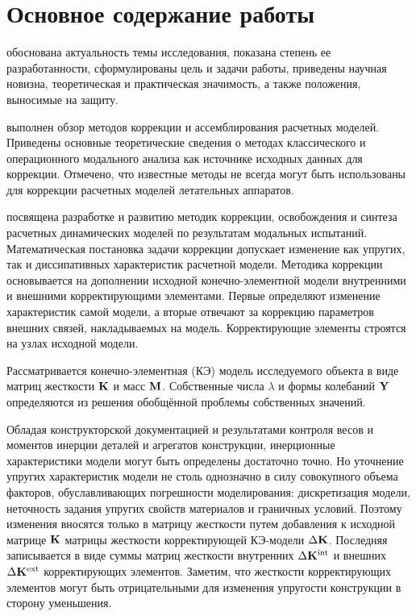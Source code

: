 
\section*{Основное содержание работы}


 обоснована актуальность темы исследования, показана степень ее разработанности, сформулированы цель и задачи работы, приведены научная новизна, теоретическая и практическая значимость, а также положения, выносимые на защиту.


 выполнен обзор методов коррекции и ассемблирования расчетных моделей. Приведены основные теоретические сведения о методах классического и операционного модального анализа как источнике исходных данных для коррекции. Отмечено, что известные методы не всегда могут быть использованы для коррекции расчетных моделей летательных аппаратов.


 посвящена разработке и развитию методик коррекции, освобождения и синтеза расчетных динамических моделей по результатам модальных испытаний. Математическая постановка задачи коррекции допускает изменение как упругих, так и диссипативных характеристик расчетной модели. Методика коррекции основывается на дополнении исходной конечно-элементной модели внутренними и внешними корректирующими элементами. Первые определяют изменение характеристик самой модели, а вторые отвечают за коррекцию параметров внешних связей, накладываемых на модель. Корректирующие элементы строятся на узлах исходной модели. 

Рассматривается конечно-элементная (КЭ) модель исследуемого объекта в виде матриц жесткости $ \mathbf{K} $ и масс $ \mathbf{M} $. Собственные числа $ \lambda $ и формы колебаний $ \mathbf{Y} $ определяются из решения обобщённой проблемы собственных значений.

Обладая конструкторской документацией и результатами контроля весов и моментов инерции деталей и агрегатов конструкции, инерционные характеристики модели могут быть определены достаточно точно. Но уточнение упругих характеристик модели не столь однозначно в силу совокупного объема факторов, обуславливающих погрешности моделирования: дискретизация модели, неточность задания упругих свойств материалов и граничных условий. Поэтому изменения вносятся только в матрицу жесткости путем добавления к исходной матрице $ \mathbf{K} $ матрицы жесткости корректирующей КЭ-модели $ \Delta \mathbf{K} $. Последняя записывается в виде суммы матриц жесткости внутренних $ \Delta \mathbf{K} ^ {\text{int}} $ и внешних $ \Delta \mathbf{K} ^ {\text{ext}} $ корректирующих элементов. Заметим, что жесткости корректирующих элементов могут быть отрицательными для изменения упругости конструкции в сторону уменьшения.

